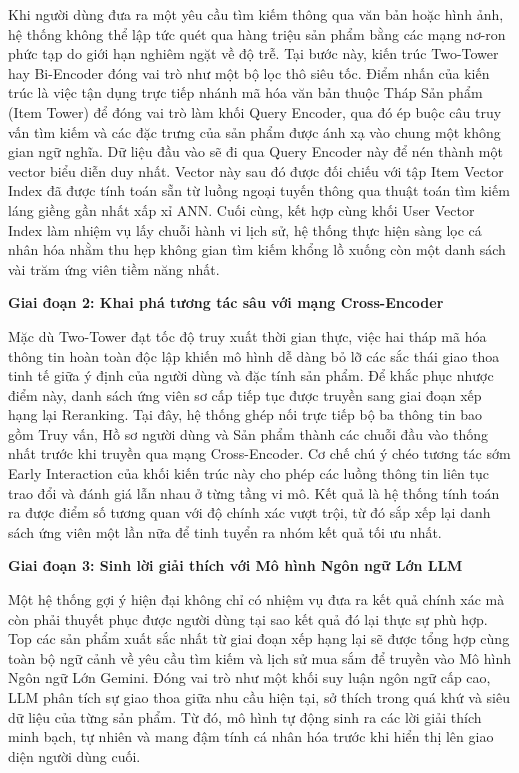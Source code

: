 Khi người dùng đưa ra một yêu cầu tìm kiếm thông qua văn bản hoặc hình ảnh, hệ thống không thể lập tức quét qua hàng triệu sản phẩm bằng các mạng nơ-ron phức tạp do giới hạn nghiêm ngặt về độ trễ. Tại bước này, kiến trúc Two-Tower hay Bi-Encoder đóng vai trò như một bộ lọc thô siêu tốc. Điểm nhấn của kiến trúc là việc tận dụng trực tiếp nhánh mã hóa văn bản thuộc Tháp Sản phẩm (Item Tower) để đóng vai trò làm khối Query Encoder, qua đó ép buộc câu truy vấn tìm kiếm và các đặc trưng của sản phẩm được ánh xạ vào chung một không gian ngữ nghĩa. Dữ liệu đầu vào sẽ đi qua Query Encoder này để nén thành một vector biểu diễn duy nhất. Vector này sau đó được đối chiếu với tập Item Vector Index đã được tính toán sẵn từ luồng ngoại tuyến thông qua thuật toán tìm kiếm láng giềng gần nhất xấp xỉ ANN. Cuối cùng, kết hợp cùng khối User Vector Index làm nhiệm vụ lấy chuỗi hành vi lịch sử, hệ thống thực hiện sàng lọc cá nhân hóa nhằm thu hẹp không gian tìm kiếm khổng lồ xuống còn một danh sách vài trăm ứng viên tiềm năng nhất.

\vspace{0.3cm}
\noindent \textbf{Giai đoạn 2: Khai phá tương tác sâu với mạng Cross-Encoder}

Mặc dù Two-Tower đạt tốc độ truy xuất thời gian thực, việc hai tháp mã hóa thông tin hoàn toàn độc lập khiến mô hình dễ dàng bỏ lỡ các sắc thái giao thoa tinh tế giữa ý định của người dùng và đặc tính sản phẩm. Để khắc phục nhược điểm này, danh sách ứng viên sơ cấp tiếp tục được truyền sang giai đoạn xếp hạng lại Reranking. Tại đây, hệ thống ghép nối trực tiếp bộ ba thông tin bao gồm Truy vấn, Hồ sơ người dùng và Sản phẩm thành các chuỗi đầu vào thống nhất trước khi truyền qua mạng Cross-Encoder. Cơ chế chú ý chéo tương tác sớm Early Interaction của khối kiến trúc này cho phép các luồng thông tin liên tục trao đổi và đánh giá lẫn nhau ở từng tầng vi mô. Kết quả là hệ thống tính toán ra được điểm số tương quan với độ chính xác vượt trội, từ đó sắp xếp lại danh sách ứng viên một lần nữa để tinh tuyển ra nhóm kết quả tối ưu nhất.

\vspace{0.3cm}
\noindent \textbf{Giai đoạn 3: Sinh lời giải thích với Mô hình Ngôn ngữ Lớn LLM}

Một hệ thống gợi ý hiện đại không chỉ có nhiệm vụ đưa ra kết quả chính xác mà còn phải thuyết phục được người dùng tại sao kết quả đó lại thực sự phù hợp. Top các sản phẩm xuất sắc nhất từ giai đoạn xếp hạng lại sẽ được tổng hợp cùng toàn bộ ngữ cảnh về yêu cầu tìm kiếm và lịch sử mua sắm để truyền vào Mô hình Ngôn ngữ Lớn Gemini. Đóng vai trò như một khối suy luận ngôn ngữ cấp cao, LLM phân tích sự giao thoa giữa nhu cầu hiện tại, sở thích trong quá khứ và siêu dữ liệu của từng sản phẩm. Từ đó, mô hình tự động sinh ra các lời giải thích minh bạch, tự nhiên và mang đậm tính cá nhân hóa trước khi hiển thị lên giao diện người dùng cuối.

